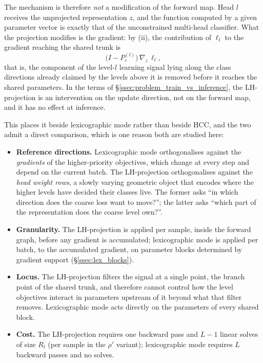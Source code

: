The mechanism is therefore \emph{not} a modification of the forward map. Head $l$
receives the unprojected representation $z$, and the function computed by a given
parameter vector is exactly that of the unconstrained multi-head classifier. What
the projection modifies is the gradient: by (ii), the contribution of $\ell_l$ to
the gradient reaching the shared trunk is
\[
\big(I-P^{(l)}_\varepsilon\big)\,\nabla_{z}\,\ell_l ,
\]
that is, the component of the level-$l$ learning signal lying along the class
directions already claimed by the levels above it is removed before it reaches the
shared parameters. In the terms of \S\ref{ssec:problem_train_vs_inference}, the
LH-projection is an intervention on the update direction, not on the forward map,
and it has no effect at inference.

This places it beside lexicographic mode rather than beside HCC, and the two admit
a direct comparison, which is one reason both are studied here:

\begin{itemize}
    \item \textbf{Reference directions.} Lexicographic mode orthogonalises against
    the \emph{gradients} of the higher-priority objectives, which change at every
    step and depend on the current batch. The LH-projection orthogonalises against
    the \emph{head weight rows}, a slowly varying geometric object that encodes
    where the higher levels have decided their classes live. The former asks
    ``in which direction does the coarse loss want to move?''; the latter asks
    ``which part of the representation does the coarse level own?''.
    \item \textbf{Granularity.} The LH-projection is applied per sample, inside the
    forward graph, before any gradient is accumulated; lexicographic mode is
    applied per batch, to the accumulated gradient, on parameter blocks determined
    by gradient support (\S\ref{ssec:lex_blocks}).
    \item \textbf{Locus.} The LH-projection filters the signal at a single point,
    the branch point of the shared trunk, and therefore cannot control how the
    level objectives interact in parameters upstream of it beyond what that filter
    removes. Lexicographic mode acts directly on the parameters of every shared
    block.
    \item \textbf{Cost.} The LH-projection requires one backward pass and $L-1$
    linear solves of size $R_l$ (per sample in the $\rho'$ variant); lexicographic
    mode requires $L$ backward passes and no solves.
\end{itemize}


